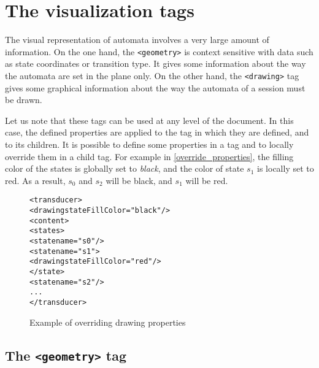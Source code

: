 \documentclass[a4paper]{article}
\newcommand{\xtag}[1]{\texttt{<#1>}}
\begin{document}
\newpage
\section{The visualization tags}
\label{title_visualization}
The visual representation of automata involves a very large amount of
information. On the one hand, the \xtag{geometry} is context sensitive
with data such as state coordinates or transition type. It gives some
information about the way the automata are set in the plane only.  On
the other hand, the \xtag{drawing} tag gives some graphical information
about the way the automata of a session must be drawn.

Let us note that these tags can be used at any level of the document.
In this case, the defined properties are applied to the tag in which
they are defined, and to its children. It is possible to define some
properties in a tag and to locally override them in a child tag. For
example in \autoref{override_properties}, the filling color of the
states is globally set to \textit{black}, and the color of state $s_1$
is locally set to red. As a result, $s_0$ and $s_2$ will be black, and
$s_1$ will be red.

\begin{figure}[htp]
  \small
  \begin{center}
\begin{alltt}
<transducer>
  <drawing stateFillColor="black"/>
  <content>
     <states>
        <state name="s0"/>
        <state name="s1">
            <drawing stateFillColor="red"/>
        </state>
        <state name="s2"/>
      ...
</transducer>
\end{alltt}

    \caption{Example of overriding drawing properties}
    \label{override_properties}
  \end{center}
\end{figure}

\subsection{The \xtag{geometry} tag}
\end{document}
